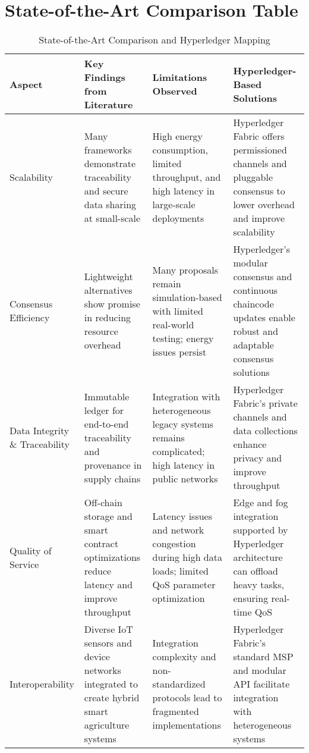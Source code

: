 \documentclass[12pt,onecolumn]{IEEEtran} %
\newcommand{\fitToPage}[1]{\begin{adjustbox}{max width=\textwidth}#1\end{adjustbox}}
\begin{document}
\section{State-of-the-Art Comparison Table}
\begin{table}[htbp]
\caption{State-of-the-Art Comparison and Hyperledger Mapping}
\label{table5}
\centering
\fitToPage{
\small
\begin{tabularx}{\textwidth}{@{}lYYY@{}}
\toprule
\textbf{Aspect} & \textbf{Key Findings from Literature} & \textbf{Limitations Observed} & \textbf{Hyperledger-Based Solutions} \\
\midrule
Scalability & Many frameworks demonstrate traceability and secure data sharing at small-scale & High energy consumption, limited throughput, and high latency in large-scale deployments & Hyperledger Fabric offers permissioned channels and pluggable consensus to lower overhead and improve scalability \\
\addlinespace
Consensus Efficiency & Lightweight alternatives show promise in reducing resource overhead & Many proposals remain simulation-based with limited real-world testing; energy issues persist & Hyperledger's modular consensus and continuous chaincode updates enable robust and adaptable consensus solutions \\
\addlinespace
Data Integrity \& Traceability & Immutable ledger for end-to-end traceability and provenance in supply chains & Integration with heterogeneous legacy systems remains complicated; high latency in public networks & Hyperledger Fabric's private channels and data collections enhance privacy and improve throughput \\
\addlinespace
Quality of Service & Off-chain storage and smart contract optimizations reduce latency and improve throughput & Latency issues and network congestion during high data loads; limited QoS parameter optimization & Edge and fog integration supported by Hyperledger architecture can offload heavy tasks, ensuring real-time QoS \\
\addlinespace
Interoperability & Diverse IoT sensors and device networks integrated to create hybrid smart agriculture systems & Integration complexity and non-standardized protocols lead to fragmented implementations & Hyperledger Fabric's standard MSP and modular API facilitate integration with heterogeneous systems \\
\bottomrule
\end{tabularx}
}
\end{table}
\end{document}
